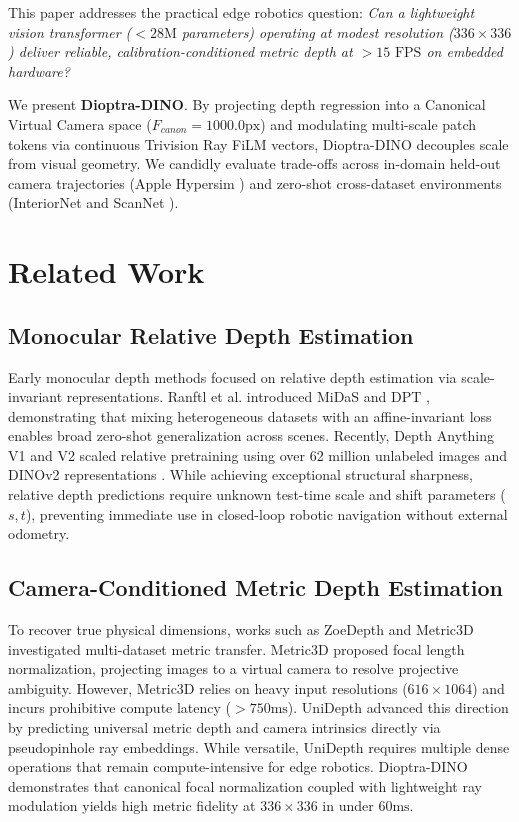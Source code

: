 \documentclass[10pt,twocolumn,letterpaper]{article}
\begin{document}
This paper addresses the practical edge robotics question: \textit{Can a lightweight vision transformer ($<28\text{M}$ parameters) operating at modest resolution ($336 \times 336$) deliver reliable, calibration-conditioned metric depth at $>15\text{ FPS}$ on embedded hardware?}

We present \textbf{Dioptra-DINO}. By projecting depth regression into a Canonical Virtual Camera space ($F_{canon} = 1000.0\text{px}$) and modulating multi-scale patch tokens via continuous Trivision Ray FiLM vectors, Dioptra-DINO decouples scale from visual geometry. We candidly evaluate trade-offs across in-domain held-out camera trajectories (Apple Hypersim \cite{roberts2021hypersim}) and zero-shot cross-dataset environments (InteriorNet \cite{li2018interiornet} and ScanNet \cite{dai2017scannet}).

\section{Related Work}

\subsection{Monocular Relative Depth Estimation}
Early monocular depth methods focused on relative depth estimation via scale-invariant representations. Ranftl et al. introduced MiDaS \cite{ranftl2020towards} and DPT \cite{ranftl2021vision}, demonstrating that mixing heterogeneous datasets with an affine-invariant loss enables broad zero-shot generalization across scenes. Recently, Depth Anything V1 and V2 \cite{yang2024depthanything, yang2024depthanythingv2} scaled relative pretraining using over 62 million unlabeled images and DINOv2 representations \cite{oquab2023dinov2}. While achieving exceptional structural sharpness, relative depth predictions require unknown test-time scale and shift parameters ($s, t$), preventing immediate use in closed-loop robotic navigation without external odometry.

\subsection{Camera-Conditioned Metric Depth Estimation}
To recover true physical dimensions, works such as ZoeDepth \cite{bhat2023zoedepth} and Metric3D \cite{yin2023metric3d} investigated multi-dataset metric transfer. Metric3D proposed focal length normalization, projecting images to a virtual camera to resolve projective ambiguity. However, Metric3D relies on heavy input resolutions ($616 \times 1064$) and incurs prohibitive compute latency ($>750\text{ms}$). UniDepth \cite{piccinelli2024unidepth} advanced this direction by predicting universal metric depth and camera intrinsics directly via pseudopinhole ray embeddings. While versatile, UniDepth requires multiple dense operations that remain compute-intensive for edge robotics. Dioptra-DINO demonstrates that canonical focal normalization coupled with lightweight ray modulation yields high metric fidelity at $336 \times 336$ in under $60\text{ms}$.
\end{document}
